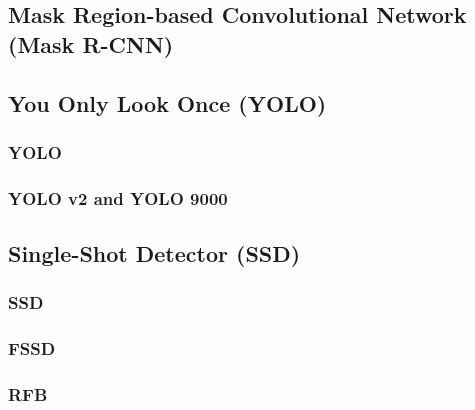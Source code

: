 \subsection*{Mask Region-based Convolutional Network (Mask R-CNN)}
\cite{bib:maskrcnn}

\subsection*{You Only Look Once (YOLO)}
\subsubsection{YOLO}
\label{sec:yolo}
\subsubsection{YOLO v2 and YOLO 9000}

\subsection*{Single-Shot Detector (SSD)}
\label{sec:ssd}
\subsubsection{SSD}
\subsubsection{FSSD}
\subsubsection{RFB}








